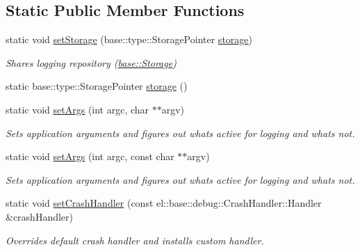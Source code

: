 \subsection*{Static Public Member Functions}
\begin{DoxyCompactItemize}
\item 
\mbox{\label{classel_1_1_helpers_af78fd39725281e3dddd7c0fbdc14f11f}} 
static void \hyperlink{classel_1_1_helpers_af78fd39725281e3dddd7c0fbdc14f11f}{set\+Storage} (base\+::type\+::\+Storage\+Pointer \hyperlink{classel_1_1_helpers_a13a5365de36b3af27660cf9b358829d3}{storage})
\begin{DoxyCompactList}\small\item\em Shares logging repository (\hyperlink{classel_1_1base_1_1_storage}{base\+::\+Storage}) \end{DoxyCompactList}\item 
static base\+::type\+::\+Storage\+Pointer \hyperlink{classel_1_1_helpers_a13a5365de36b3af27660cf9b358829d3}{storage} ()
\item 
\mbox{\label{classel_1_1_helpers_a68748f618a0c2840b96dc12532b09bf0}} 
static void \hyperlink{classel_1_1_helpers_a68748f618a0c2840b96dc12532b09bf0}{set\+Args} (int argc, char $\ast$$\ast$argv)
\begin{DoxyCompactList}\small\item\em Sets application arguments and figures out whats active for logging and whats not. \end{DoxyCompactList}\item 
static void \hyperlink{classel_1_1_helpers_afac7a023e2c13a62d0295cf0239eb848}{set\+Args} (int argc, const char $\ast$$\ast$argv)
\begin{DoxyCompactList}\small\item\em Sets application arguments and figures out whats active for logging and whats not. \end{DoxyCompactList}\item 
static void \hyperlink{classel_1_1_helpers_a4155f6fff0074ad93aa56fd7fe064097}{set\+Crash\+Handler} (const el\+::base\+::debug\+::\+Crash\+Handler\+::\+Handler \&crash\+Handler)
\begin{DoxyCompactList}\small\item\em Overrides default crash handler and installs custom handler. \end{DoxyCompactList}\item 

\end{DoxyCompactItemize}
